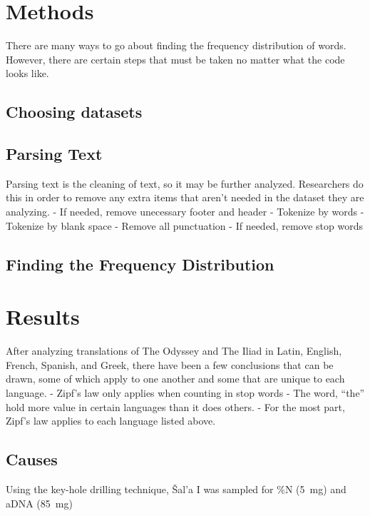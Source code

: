 \documentclass[a4paper,10pt]{article}
\newcounter{code}[section]
\begin{document}
	

\section{Methods}

There are many ways to go about finding the frequency distribution of words. However, there are certain steps that must be taken no matter what the code looks like.  

\subsection{Choosing datasets}


\subsection{Parsing Text}

Parsing text is the cleaning of text, so it may be further analyzed. Researchers do this in order to remove any extra items that aren’t needed in the dataset they are analyzing.  
-  If needed, remove unecessary footer and header
- Tokenize by words
- Tokenize by blank space
- Remove all punctuation
- If needed, remove stop words

\subsection{Finding the Frequency Distribution}

\section{Results}

After analyzing translations of The Odyssey and The Iliad in Latin, English, French, Spanish, and Greek, there have been a few conclusions that can be drawn, some of which apply to one another and some that are unique to each language. 
- Zipf’s law only applies when counting in stop words
- The word, “the” hold more value in certain languages than it does others.
- For the most part, Zipf’s law applies to each language listed above.



\subsection{Causes}

Using the key-hole drilling technique, Šal'a I was sampled for \%N (5~mg) and aDNA (85~mg) 
\end{document}
